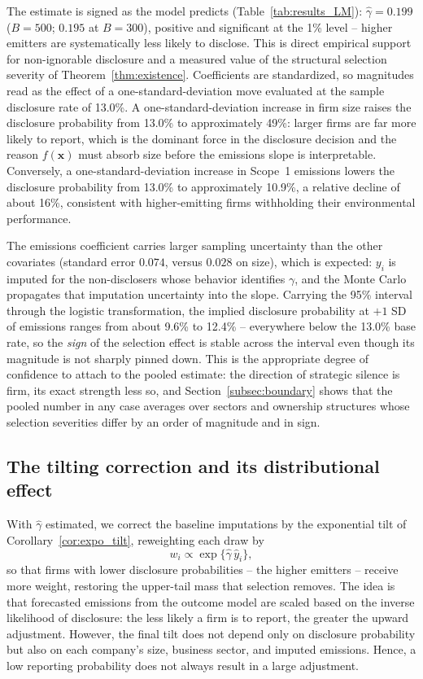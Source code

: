 \documentclass[a4paper,12pt]{article}
\begin{document}
The estimate is signed as the model predicts (Table~\ref{tab:results_LM}): $\hat\gamma = 0.199$ ($B=500$; $0.195$ at $B=300$), positive and significant at the 1\% level -- higher emitters are systematically less likely to disclose. This is direct empirical support for non-ignorable disclosure and a measured value of the structural selection severity of Theorem~\ref{thm:existence}. Coefficients are standardized, so magnitudes read as the effect of a one-standard-deviation move evaluated at the sample disclosure rate of 13.0\%. A one-standard-deviation increase in firm size raises the disclosure probability from 13.0\% to approximately 49\%: larger firms are far more likely to report, which is the dominant force in the disclosure decision and the reason $f(\mathbf{x})$ must absorb size before the emissions slope is interpretable. Conversely, a one-standard-deviation increase in Scope~1 emissions lowers the disclosure probability from 13.0\% to approximately 10.9\%, a relative decline of about 16\%, consistent with higher-emitting firms withholding their environmental performance.

The emissions coefficient carries larger sampling uncertainty than the other covariates (standard error $0.074$, versus $0.028$ on size), which is expected: $y_i$ is imputed for the non-disclosers whose behavior identifies $\gamma$, and the Monte Carlo propagates that imputation uncertainty into the slope. Carrying the 95\% interval through the logistic transformation, the implied disclosure probability at $+1$ SD of emissions ranges from about 9.6\% to 12.4\% -- everywhere below the 13.0\% base rate, so the \emph{sign} of the selection effect is stable across the interval even though its magnitude is not sharply pinned down. This is the appropriate degree of confidence to attach to the pooled estimate: the direction of strategic silence is firm, its exact strength less so, and Section~\ref{subsec:boundary} shows that the pooled number in any case averages over sectors and ownership structures whose selection severities differ by an order of magnitude and in sign.


\subsection{The tilting correction and its distributional effect}
\label{subsec:tilting_adj}

With $\hat\gamma$ estimated, we correct the baseline imputations by the exponential tilt of Corollary~\ref{cor:expo_tilt}, reweighting each draw by
\begin{equation}
\label{eq:tilting_weights}
w_i \propto \exp\{\hat\gamma\, \hat{y}_i\},
\end{equation}
so that firms with lower disclosure probabilities -- the higher emitters -- receive more weight, restoring the upper-tail mass that selection removes. The idea is that forecasted emissions from the outcome model are scaled based on the inverse likelihood of disclosure: the less likely a firm is to report, the greater the upward adjustment. However, the final tilt does not depend only on disclosure probability but also on each company's size, business sector, and imputed emissions. Hence, a low reporting probability does not always result in a large adjustment. 
\end{document}
